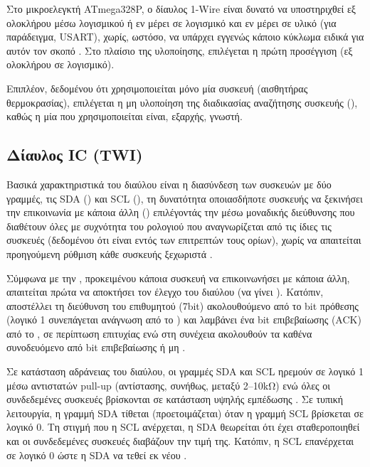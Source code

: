 Στο μικροελεγκτή ATmega328P, ο δίαυλος 1-Wire είναι δυνατό να υποστηριχθεί εξ
ολοκλήρου μέσω λογισμικού ή εν μέρει σε λογισμικό και εν μέρει σε υλικό (για
παράδειγμα, USART), χωρίς, ωστόσο, να υπάρχει εγγενώς κάποιο κύκλωμα ειδικά για
αυτόν τον σκοπό \parencite[3]{atmel04}. Στο πλαίσιο της υλοποίησης, επιλέγεται η
πρώτη προσέγγιση (εξ ολοκλήρου σε λογισμικό).

Επιπλέον, δεδομένου ότι χρησιμοποιείται μόνο μία συσκευή (αισθητήρας
θερμοκρασίας), επιλέγεται η μη υλοποίηση της διαδικασίας αναζήτησης 
συσκευής (), καθώς η μία που χρησιμοποιείται είναι, εξαρχής,
γνωστή.


\subsection{Δίαυλος I\protect{}C (TWI)}

Βασικά χαρακτηριστικά του διαύλου είναι η διασύνδεση των συσκευών με δύο
γραμμές, τις SDA () και SCL (), τη δυνατότητα
οποιασδήποτε συσκευής να ξεκινήσει την επικοινωνία με κάποια άλλη
() επιλέγοντάς την μέσω μοναδικής διεύθυνσης που διαθέτουν
όλες με συχνότητα του ρολογιού που αναγνωρίζεται από τις ίδιες τις συσκευές
(δεδομένου ότι είναι εντός των επιτρεπτών τους ορίων), χωρίς να απαιτείται
προηγούμενη ρύθμιση κάθε συσκευής ξεχωριστά \parencite[3--4,6]{nxp14}.

Σύμφωνα με την \textcite[6]{nxp14}, προκειμένου κάποια συσκευή να επικοινωνήσει
με κάποια άλλη, απαιτείται πρώτα να αποκτήσει τον έλεγχο του διαύλου (να γίνει
). Κατόπιν, αποστέλλει τη διεύθυνση του επιθυμητού  (7bit)
ακολουθούμενο από το bit πρόθεσης (λογικό 1 συνεπάγεται ανάγνωση από το
) και λαμβάνει ένα bit επιβεβαίωσης (ACK) από το , σε
περίπτωση επιτυχίας ενώ στη συνέχεια ακολουθούν τα  καθένα συνοδευόμενο
από bit επιβεβαίωσης ή μη \parencite[10,13]{nxp14}.

Σε κατάσταση αδράνειας του διαύλου, οι γραμμές SDA και SCL ηρεμούν σε λογικό 1
μέσω αντιστατών pull-up (αντίστασης, συνήθως, μεταξύ 2--10kΩ) ενώ όλες οι
συνδεδεμένες συσκευές βρίσκονται σε κατάσταση υψηλής εμπέδωσης
\parencites[13]{phillips03}[8]{nxp14}. Σε τυπική λειτουργία, η γραμμή SDA
τίθεται (προετοιμάζεται) όταν η γραμμή SCL βρίσκεται σε λογικό 0. Τη στιγμή που
η SCL ανέρχεται, η SDA θεωρείται ότι έχει σταθεροποιηθεί και οι συνδεδεμένες
συσκευές διαβάζουν την τιμή της. Κατόπιν, η SCL επανέρχεται σε λογικό 0 ώστε η
SDA να τεθεί εκ νέου \parencite[9]{nxp14}.

